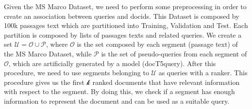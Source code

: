Given the MS Marco Dataset, we need to perform some preprocessing in order to create an association between queries and docids.
This Dataset is composed by 100k passages text which are partitioned into Training, Validation and Test. Each partition is composed by lists of passages texts and related queries.
We create a set $\mathcal{U} = \mathcal{O} \cup \mathcal{P}$, where $\mathcal{O}$ is the set composed by each segment (passage text) of the MS Marco Dataset, while $\mathcal{P}$ is the set of pseudo-queries from each segment of $\mathcal{O}$, which are artificially generated by a model (docT5query).
After this procedure, we need to use segments belonging to $\mathcal{U}$ as queries with a ranker. This procedure gives us the first $\mathcal{k}$ ranked documents that have relevant information with respect to the segment.
By doing this, we check if a segment has enough information to represent the document and can be used as a suitable query.
